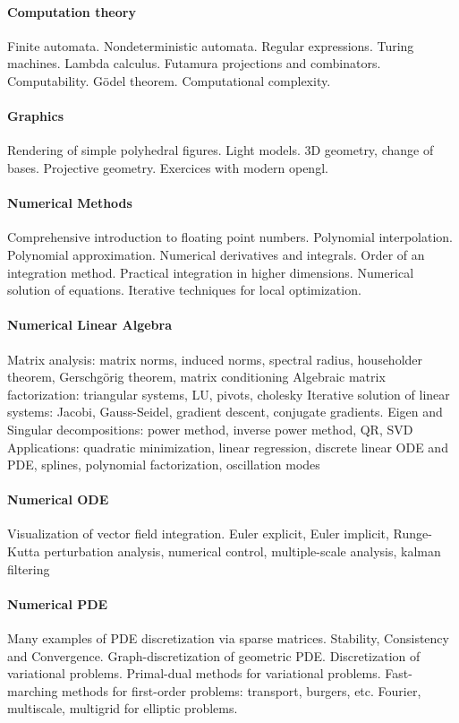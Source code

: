 \paragraph{Computation theory}
Finite automata. Nondeterministic automata. Regular expressions.
Turing machines.  Lambda calculus.  Futamura projections and combinators.
Computability.  Gödel theorem.
Computational complexity.

\paragraph{Graphics}
Rendering of simple polyhedral figures.  Light models.
3D geometry, change of bases.  Projective geometry.
Exercices with modern opengl.

\paragraph{Numerical Methods}
Comprehensive introduction to floating point numbers.
Polynomial interpolation.
Polynomial approximation.
Numerical derivatives and integrals.
Order of an integration method.
Practical integration in higher dimensions.
Numerical solution of equations.
Iterative techniques for local optimization.

\paragraph{Numerical Linear Algebra}
Matrix analysis: matrix norms, induced norms, spectral radius, householder
theorem, Gerschgörig theorem, matrix conditioning
Algebraic matrix factorization: triangular systems, LU, pivots, cholesky
Iterative solution of linear systems: Jacobi, Gauss-Seidel, gradient descent,
conjugate gradients.
Eigen and Singular decompositions: power method, inverse power method, QR,
SVD
Applications: quadratic minimization, linear regression, discrete linear ODE
and PDE, splines, polynomial factorization, oscillation modes

\paragraph{Numerical ODE}
Visualization of vector field integration.
Euler explicit, Euler implicit, Runge-Kutta
perturbation analysis, numerical control,
multiple-scale analysis, kalman filtering

\paragraph{Numerical PDE}
Many examples of PDE discretization via sparse matrices.
Stability, Consistency and Convergence.
Graph-discretization of geometric PDE.
Discretization of variational problems.
Primal-dual methods for variational problems.
Fast-marching methods for first-order problems: transport, burgers, etc.
Fourier, multiscale, multigrid for elliptic problems.

